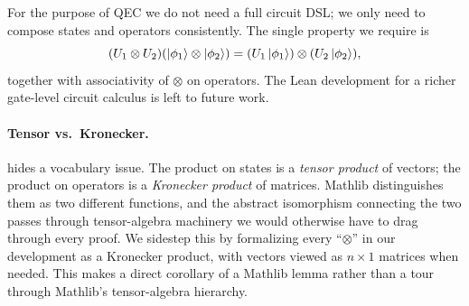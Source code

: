 %
%
%

For the purpose of QEC we do not need a full circuit DSL; we only need to
compose states and operators consistently. The single property we require is
\begin{equation}
\label{eq:kron-ustate}
(U_1 \otimes U_2)(\ket{\phi_1} \otimes \ket{\phi_2}) = (U_1 \ket{\phi_1}) \otimes (U_2 \ket{\phi_2}),
\end{equation}
together with associativity of $\otimes$ on operators. The Lean development for
a richer gate-level circuit calculus is left to future work.

\paragraph{Tensor vs.\ Kronecker.}  hides a vocabulary
issue. The product on states is a \emph{tensor product} of vectors; the product
on operators is a \emph{Kronecker product} of matrices. Mathlib distinguishes
them as two different functions, and the abstract isomorphism connecting the two
passes through tensor-algebra machinery we would otherwise have to drag through
every proof. We sidestep this by formalizing every ``$\otimes$'' in our
development as a Kronecker product, with vectors viewed as $n \times 1$ matrices
when needed. This makes  a direct corollary of a Mathlib
lemma rather than a tour through Mathlib's tensor-algebra hierarchy.

